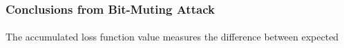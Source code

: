 \documentclass[12pt,letterpaper]{article}
\begin{document}
\begin{figure}[h]
	\centering
	\label{results}

\end{figure}

\subsubsection{Conclusions from Bit-Muting Attack}

\paragraph*{}The accumulated loss function value measures the difference between expected
\end{document}

